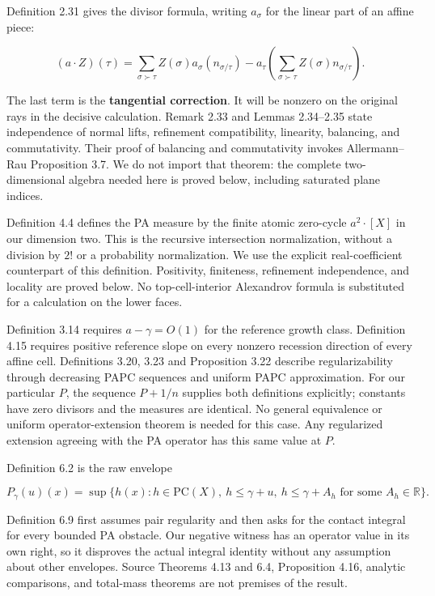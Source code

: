 \documentclass[
  10pt,
]{article}
\begin{document}
Definition 2.31 gives the divisor formula, writing \(a_\sigma\) for the
linear part of an affine piece:

\[
(a\cdot Z)(\tau)=
\sum_{\sigma\succ\tau} Z(\sigma)a_\sigma(n_{\sigma/\tau})
-a_\tau\left(\sum_{\sigma\succ\tau}Z(\sigma)n_{\sigma/\tau}\right).
\tag{D}
\]

The last term is the \textbf{tangential correction}. It will be nonzero
on the original rays in the decisive calculation. Remark 2.33 and Lemmas
2.34--2.35 state independence of normal lifts, refinement compatibility,
linearity, balancing, and commutativity. Their proof of balancing and
commutativity invokes Allermann--Rau Proposition 3.7. We do not import
that theorem: the complete two-dimensional algebra needed here is proved
below, including saturated plane indices.

Definition 4.4 defines the PA measure by the finite atomic zero-cycle
\(a^2\cdot[X]\) in our dimension two. This is the recursive intersection
normalization, without a division by \(2!\) or a probability
normalization. We use the explicit real-coefficient counterpart of this
definition. Positivity, finiteness, refinement independence, and
locality are proved below. No top-cell-interior Alexandrov formula is
substituted for a calculation on the lower faces.

Definition 3.14 requires \(a-\gamma=O(1)\) for the reference growth
class. Definition 4.15 requires positive reference slope on every
nonzero recession direction of every affine cell. Definitions 3.20, 3.23
and Proposition 3.22 describe regularizability through decreasing PAPC
sequences and uniform PAPC approximation. For our particular \(P\), the
sequence \(P+1/n\) supplies both definitions explicitly; constants have
zero divisors and the measures are identical. No general equivalence or
uniform operator-extension theorem is needed for this case. Any
regularized extension agreeing with the PA operator has this same value
at \(P\).

Definition 6.2 is the raw envelope

\[
P_\gamma(u)(x)=\sup\{h(x):h\in\mathrm{PC}(X),\ h\leq\gamma+u,
\ h\leq\gamma+A_h\text{ for some }A_h\in\mathbb R\}. \tag{E}
\]

Definition 6.9 first assumes pair regularity and then asks for the
contact integral for every bounded PA obstacle. Our negative witness has
an operator value in its own right, so it disproves the actual integral
identity without any assumption about other envelopes. Source Theorems
4.13 and 6.4, Proposition 4.16, analytic comparisons, and total-mass
theorems are not premises of the result.
\end{document}
